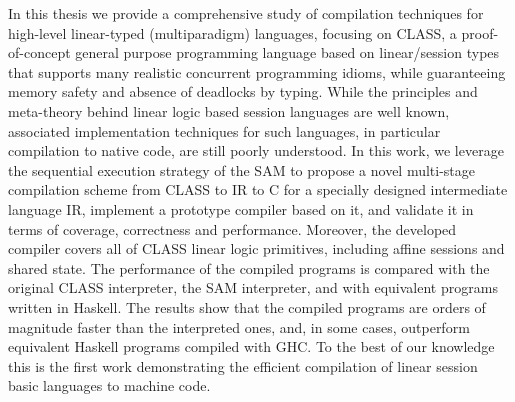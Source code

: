 \acresetall
\noindent In this thesis we provide a comprehensive study of compilation techniques for high-level linear-typed (multiparadigm) languages, focusing on CLASS, a proof-of-concept general purpose programming language based on linear/session types that supports many realistic concurrent programming idioms, while guaranteeing memory safety and  absence of deadlocks by typing.
While the principles and meta-theory behind linear logic based session languages are well known, associated implementation techniques for such languages, in particular compilation to native code, are still poorly understood. In this work, we leverage the sequential execution strategy of the \acf{SAM} to propose a novel multi-stage compilation scheme from CLASS to IR to C for a specially designed intermediate language IR,
implement a prototype compiler based on it, and validate it in terms of coverage, correctness and performance. Moreover, the developed compiler covers all of CLASS linear logic primitives, including affine sessions and shared state.  The performance of the compiled programs is compared with the original CLASS interpreter, the SAM interpreter, and with equivalent programs written in Haskell. The results show that the compiled programs are orders of magnitude faster than the interpreted ones, and, in some cases, outperform equivalent Haskell programs compiled with GHC. To the best of our knowledge this is the first work demonstrating the efficient compilation of linear session basic languages to machine code.
